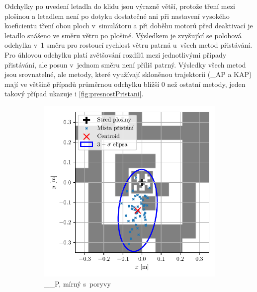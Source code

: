     Odchylky po uvedení letadla do klidu jsou výrazně větší, protože tření mezi plošinou a letadlem není po dotyku dostatečné ani při nastavení vysokého koeficientu tření obou ploch v~simulátoru a při doběhu motorů před deaktivací je letadlo snášeno ve směru větru po plošině. Výsledkem je zvyšující se polohová odchylka v~1 směru pro rostoucí rychlost větru patrná u~všech metod přistávání. Pro úhlovou odchylku platí zvětšování rozdílů mezi jednotlivými případy přistávání, ale posun v~jednom směru není příliš patrný. Výsledky všech metod jsou srovnatelné, ale metody, které využívají skloněnou trajektorii (\_AP a KAP) mají ve většině případů průměrnou odchylku bližší 0 než ostatní metody, jeden takový případ ukazuje i \cref{fig:presnostPristani}.

    \begin{figure}[H]
      \centering
      \begin{subfigure}[b]{0.495\textwidth}
        \includegraphics[width=\textwidth]{img/results/__P1_vitr2_pristani.pdf}
        \caption{\_\_P, mírný s~poryvy}
      \end{subfigure}
      \hfill
      \begin{subfigure}[b]{0.495\textwidth}

\end{subfigure}
\end{figure}
